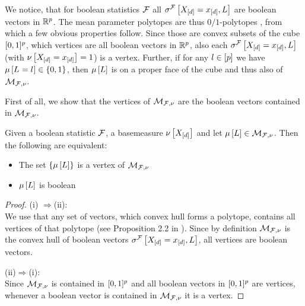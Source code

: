 We notice, that for boolean statistics $\mathcal{F}$ all $\sigma^{\mathcal{F}}\left[X_{[d]}=x_{[d]},L\right]$ are boolean vectors in $\mathbb{R}^{p}$.
The mean parameter polytopes are thus $0/1$-polytopes \cite{ziegler_lectures_2000,gillmann_01-polytopes_2007}, from which a few obvious properties follow.
Since those are convex subsets of the cube $[0,1]^p$, which vertices are all boolean vectors in $\mathbb{R}^{p}$, also each $\sigma^{\mathcal{F}}\left[X_{[d]}=x_{[d]},L\right]$ (with $\nu\left[X_{[d]}=x_{[d]}\right]=1$) is a vertex.
Further, if for any $l\in[p]$ we have $\mu\left[L_{}=l_{}\right]\in\{0,1\}$, then $\mu\left[L\right]$ is on a proper face of the cube and thus also of $\mathcal{M}_{\mathcal{F},\nu}$.


First of all, we show that the vertices of $\mathcal{M}_{\mathcal{F},\nu}$ are the boolean vectors contained in $\mathcal{M}_{\mathcal{F},\nu}$.

\begin{theorem}
    \label{the:vertexByHardLogicNetworks}
    Given a boolean statistic $\mathcal{F}$, a basemeasure $\nu\left[X_{[d]}\right]$ and let $\mu\left[L\right]\in\mathcal{M}_{\mathcal{F},\nu}$.
    Then the following are equivalent:
    \begin{itemize}
        \item[(i)] The set $\{\mu\left[L\right]\}$ is a vertex of $\mathcal{M}_{\mathcal{F},\nu}$
        \item[(ii)] $\mu\left[L\right]$ is boolean
    \end{itemize}
\end{theorem}
\begin{proof}
(i)
    $\Rightarrow$(ii): \\
    We use that any set of vectors, which convex hull forms a polytope, contains all vertices of that polytope (see Proposition 2.2 in \cite{ziegler_lectures_2013}).
    Since by definition $\mathcal{M}_{\mathcal{F},\nu}$ is the convex hull of boolean vectors $\sigma^{\mathcal{F}}\left[X_{[d]}=x_{[d]},L\right]$, all vertices are boolean vectors.

    (ii)$\Rightarrow$(i): \\
    Since $\mathcal{M}_{\mathcal{F},\nu}$ is contained in $[0,1]^{p}$ and all boolean vectors in $[0,1]^{p}$ are vertices, whenever a boolean vector is contained in $\mathcal{M}_{\mathcal{F},\nu}$ it is a vertex.
\end{proof}

